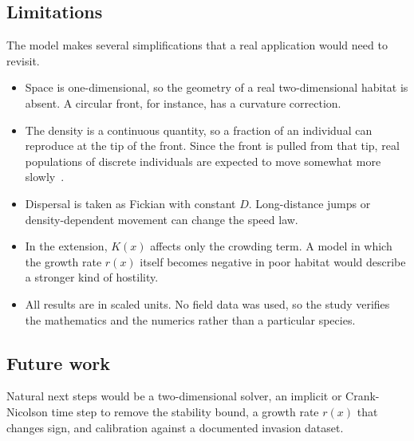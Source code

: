\documentclass[11pt,a4paper]{article}
\begin{document}
\subsection{Limitations}
The model makes several simplifications that a real application would need to revisit.
\begin{itemize}
  \item Space is one-dimensional, so the geometry of a real two-dimensional habitat is absent. A
        circular front, for instance, has a curvature correction.
  \item The density is a continuous quantity, so a fraction of an individual can reproduce at the tip of the
        front. Since the front is pulled from that tip, real populations of discrete
        individuals are expected to move somewhat more slowly~\cite{saarloos}.
  \item Dispersal is taken as Fickian with constant $D$. Long-distance jumps or density-dependent
        movement can change the speed law.
  \item In the extension, $K(x)$ affects only the crowding term. A model in which the growth rate
        $r(x)$ itself becomes negative in poor habitat would describe a stronger kind of hostility.
  \item All results are in scaled units. No field data was used, so the study verifies
        the mathematics and the numerics rather than a particular species.
\end{itemize}

\subsection{Future work}
Natural next steps would be a two-dimensional solver, an implicit or Crank-Nicolson time step to
remove the stability bound, a growth rate $r(x)$ that changes sign, and calibration against a documented
invasion dataset.
\end{document}
